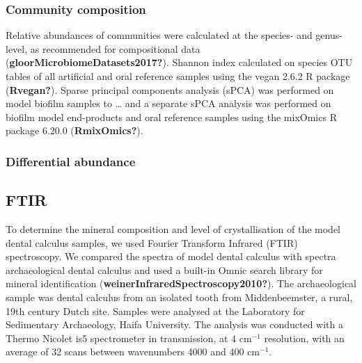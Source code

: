 \documentclass[
]{article}
\begin{document}
\hypertarget{community-composition}{%
\subsubsection{Community composition}\label{community-composition}}

Relative abundances of communities were calculated at the species- and
genus-level, as recommended for compositional data
(\textbf{gloorMicrobiomeDatasets2017?}). Shannon index calculated on
species OTU tables of all artificial and oral reference samples using
the vegan 2.6.2 R package (\textbf{Rvegan?}). Sparse principal
components analysis (sPCA) was performed on model biofilm samples to
\ldots{} and a separate sPCA analysis was performed on biofilm model
end-products and oral reference samples using the mixOmics R package
6.20.0 (\textbf{RmixOmics?}).

\hypertarget{differential-abundance}{%
\subsubsection{Differential abundance}\label{differential-abundance}}

\hypertarget{ftir}{%
\subsection{FTIR}\label{ftir}}

To determine the mineral composition and level of crystallisation of the
model dental calculus samples, we used Fourier Transform Infrared (FTIR)
spectroscopy. We compared the spectra of model dental calculus with
spectra archaeological dental calculus and used a built-in Omnic search
library for mineral identification
(\textbf{weinerInfraredSpectroscopy2010?}). The archaeological sample
was dental calculus from an isolated tooth from Middenbeemster, a rural,
19th century Dutch site. Samples were analysed at the Laboratory for
Sedimentary Archaeology, Haifa University. The analysis was conducted
with a Thermo Nicolet is5 spectrometer in transmission, at 4 cm\(^{-1}\)
resolution, with an average of 32 scans between wavenumbers 4000 and 400
cm\(^{-1}\).
\end{document}
